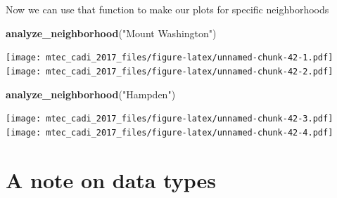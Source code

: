 \documentclass[12pt,]{book}
\newenvironment{Shaded}{\begin{snugshade}}{\end{snugshade}}
\newcommand{\KeywordTok}[1]{\textcolor[rgb]{0.13,0.29,0.53}{\textbf{#1}}}
\newcommand{\DataTypeTok}[1]{\textcolor[rgb]{0.13,0.29,0.53}{#1}}
\newcommand{\StringTok}[1]{\textcolor[rgb]{0.31,0.60,0.02}{#1}}
\newcommand{\ControlFlowTok}[1]{\textcolor[rgb]{0.13,0.29,0.53}{\textbf{#1}}}
\newcommand{\OperatorTok}[1]{\textcolor[rgb]{0.81,0.36,0.00}{\textbf{#1}}}
\newcommand{\NormalTok}[1]{#1}
\theoremstyle{definition}
\theoremstyle{definition}
\theoremstyle{definition}
\theoremstyle{remark}
\begin{document}
\begin{Shaded}
\end{Shaded}

Now we can use that function to make our plots for specific
neighborhoods

\begin{Shaded}
\begin{Highlighting}[]
\KeywordTok{analyze_neighborhood}\NormalTok{(}\StringTok{"Mount Washington"}\NormalTok{)}
\end{Highlighting}
\end{Shaded}

\texttt{[image: mtec\_cadi\_2017\_files/figure-latex/unnamed-chunk-42-1.pdf]}
\texttt{[image: mtec\_cadi\_2017\_files/figure-latex/unnamed-chunk-42-2.pdf]}

\begin{Shaded}
\begin{Highlighting}[]
\KeywordTok{analyze_neighborhood}\NormalTok{(}\StringTok{"Hampden"}\NormalTok{)}
\end{Highlighting}
\end{Shaded}

\texttt{[image: mtec\_cadi\_2017\_files/figure-latex/unnamed-chunk-42-3.pdf]}
\texttt{[image: mtec\_cadi\_2017\_files/figure-latex/unnamed-chunk-42-4.pdf]}

\section{A note on data types}\label{a-note-on-data-types}
\end{document}
